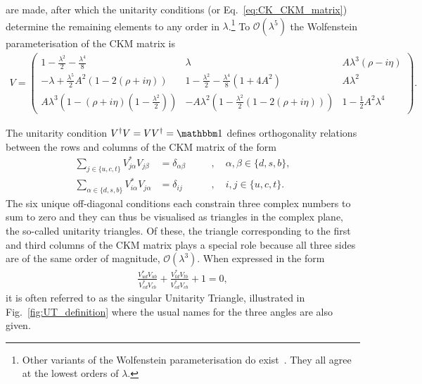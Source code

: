 are made, after which the unitarity conditions (or Eq.~\ref{eq:CK_CKM_matrix}) determine the remaining elements to any order in $\lambda$.\footnote{Other variants of the Wolfenstein parameterisation do exist~\cite{ahnWolfensteinParametrizationHigher2011}. They all agree at the lowest orders of $\lambda$.} 
To $\mathcal O (\lambda^5)$ the Wolfenstein parameterisation of the CKM matrix is~\cite{burasWaitingTopQuark1994,charlesCPViolationCKM2005}
% 
\begin{align}\label{eq:CKM_Wolf}
    V = \begin{pmatrix}
        1-\frac{\lambda^2}{2} -\frac{\lambda^4}{8}&
        \lambda &
        A\lambda^3(\rho - i \eta) \\
        -\lambda+\frac{\lambda^5}{2}A^2(1-2(\rho+i\eta)) &
        1 - \frac{\lambda^2}{2} - \frac{\lambda^4}{8}(1+4A^2) &
        A\lambda^2 \\
        A \lambda^3(1-(\rho + i\eta)(1 - \frac{\lambda^2}{2})) &
        -A\lambda^2 (1- \frac{\lambda^2}{2}(1-2(\rho+i\eta)))&
        1 - \frac{1}{2}A^2\lambda^4
    \end{pmatrix}.
\end{align}{}

\begin{mccorrection}The unitarity condition $V^\dagger V = VV^\dagger= \mathbbm 1$ defines orthogonality relations between the rows and columns of the CKM matrix of the form
\begin{subequations}
    \begin{align}
    \sum_{j\in\{u,c,t\}} V^*_{j\alpha}V_{j\beta} &= \delta_{\alpha\beta}\quad&&,\quad \alpha, \beta\in\{d, s, b\}, \\
    \sum_{\alpha\in\{d, s, b\}} V^*_{i\alpha}V_{j\alpha} &= \delta_{ij}\quad&&,\quad i, j\in\{u, c, t\}.
\end{align}
\end{subequations}
The six unique off-diagonal conditions each constrain three complex numbers to sum to zero and they can thus be visualised as triangles in the complex plane, the so-called unitarity triangles. Of these, the triangle corresponding to the first and third columns of the CKM matrix plays a special role because all three sides are of the same order of magnitude, $\mathcal O(\lambda^3)$. When expressed in the form
\begin{align}
    \frac{V^*_{ud}V_{ub}}{V^*_{cd}V_{cb}} +  \frac{V^*_{td}V_{tb}}{V^*_{cd}V_{cb}} +1 = 0,
\end{align}
it is often referred to as the singular Unitarity Triangle, illustrated in Fig.~\ref{fig:UT_definition} where the usual names for the three angles are also given.\end{mccorrection}

